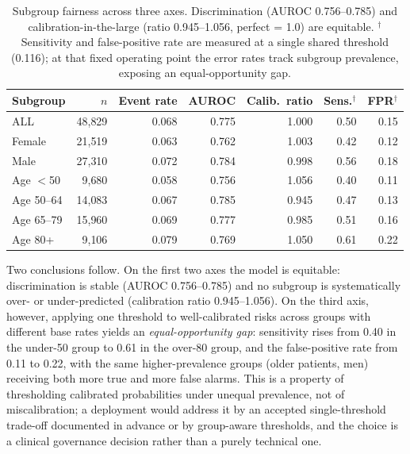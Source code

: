 \begin{table}[H]
    \centering
    \begin{tabular}{l|r|r|r|r|r|r}
        \hline
        \textbf{Subgroup} & \textbf{$n$} & \textbf{Event rate} & \textbf{AUROC} & \textbf{Calib.\ ratio} & \textbf{Sens.}$^\dagger$ & \textbf{FPR}$^\dagger$ \\
        \hline\hline
        ALL      & 48{,}829 & 0.068 & 0.775 & 1.000 & 0.50 & 0.15 \\
        Female   & 21{,}519 & 0.063 & 0.762 & 1.003 & 0.42 & 0.12 \\
        Male     & 27{,}310 & 0.072 & 0.784 & 0.998 & 0.56 & 0.18 \\
        Age $<$50 & 9{,}680  & 0.058 & 0.756 & 1.056 & 0.40 & 0.11 \\
        Age 50--64 & 14{,}083 & 0.067 & 0.785 & 0.945 & 0.47 & 0.13 \\
        Age 65--79 & 15{,}960 & 0.069 & 0.777 & 0.985 & 0.51 & 0.16 \\
        Age 80+  & 9{,}106  & 0.079 & 0.769 & 1.050 & 0.61 & 0.22 \\
        \hline
    \end{tabular}
    \caption{Subgroup fairness across three axes. Discrimination (AUROC
    0.756--0.785) and calibration-in-the-large (ratio 0.945--1.056, perfect
    = 1.0) are equitable. $^\dagger$Sensitivity and false-positive rate are
    measured at a single shared threshold (0.116); at that fixed operating
    point the error rates track subgroup prevalence, exposing an
    equal-opportunity gap.}
    \label{table:subgroups}
\end{table}

Two conclusions follow. On the first two axes the model is equitable:
discrimination is stable (AUROC 0.756--0.785) and no subgroup is systematically
over- or under-predicted (calibration ratio 0.945--1.056). On the third axis,
however, applying one threshold to well-calibrated risks across groups with
different base rates yields an \emph{equal-opportunity gap}: sensitivity rises
from 0.40 in the under-50 group to 0.61 in the over-80 group, and the
false-positive rate from 0.11 to 0.22, with the same higher-prevalence groups
(older patients, men) receiving both more true and more false alarms. This is a
property of thresholding calibrated probabilities under unequal prevalence, not
of miscalibration; a deployment would address it by an accepted single-threshold
trade-off documented in advance or by group-aware thresholds, and the choice is
a clinical governance decision rather than a purely technical one.


